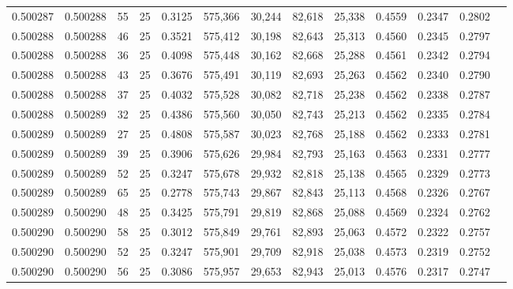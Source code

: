 \begin{tabular}{rrrrrrrrrrrrr}
0.500287 & 0.500288 &    55 &  25 &                                     0.3125 & 575,366 &  30,244 &  82,618 &  25,338 & 0.4559 & 0.2347 & 0.2802 \\
0.500288 & 0.500288 &    46 &  25 &                                     0.3521 & 575,412 &  30,198 &  82,643 &  25,313 & 0.4560 & 0.2345 & 0.2797 \\
0.500288 & 0.500288 &    36 &  25 &                                     0.4098 & 575,448 &  30,162 &  82,668 &  25,288 & 0.4561 & 0.2342 & 0.2794 \\
0.500288 & 0.500288 &    43 &  25 &                                     0.3676 & 575,491 &  30,119 &  82,693 &  25,263 & 0.4562 & 0.2340 & 0.2790 \\
0.500288 & 0.500288 &    37 &  25 &                                     0.4032 & 575,528 &  30,082 &  82,718 &  25,238 & 0.4562 & 0.2338 & 0.2787 \\
0.500288 & 0.500289 &    32 &  25 &                                     0.4386 & 575,560 &  30,050 &  82,743 &  25,213 & 0.4562 & 0.2335 & 0.2784 \\
0.500289 & 0.500289 &    27 &  25 &                                     0.4808 & 575,587 &  30,023 &  82,768 &  25,188 & 0.4562 & 0.2333 & 0.2781 \\
0.500289 & 0.500289 &    39 &  25 &                                     0.3906 & 575,626 &  29,984 &  82,793 &  25,163 & 0.4563 & 0.2331 & 0.2777 \\
0.500289 & 0.500289 &    52 &  25 &                                     0.3247 & 575,678 &  29,932 &  82,818 &  25,138 & 0.4565 & 0.2329 & 0.2773 \\
0.500289 & 0.500289 &    65 &  25 &                                     0.2778 & 575,743 &  29,867 &  82,843 &  25,113 & 0.4568 & 0.2326 & 0.2767 \\
0.500289 & 0.500290 &    48 &  25 &                                     0.3425 & 575,791 &  29,819 &  82,868 &  25,088 & 0.4569 & 0.2324 & 0.2762 \\
0.500290 & 0.500290 &    58 &  25 &                                     0.3012 & 575,849 &  29,761 &  82,893 &  25,063 & 0.4572 & 0.2322 & 0.2757 \\
0.500290 & 0.500290 &    52 &  25 &                                     0.3247 & 575,901 &  29,709 &  82,918 &  25,038 & 0.4573 & 0.2319 & 0.2752 \\
0.500290 & 0.500290 &    56 &  25 &                                     0.3086 & 575,957 &  29,653 &  82,943 &  25,013 & 0.4576 & 0.2317 & 0.2747 \\

\end{tabular}
